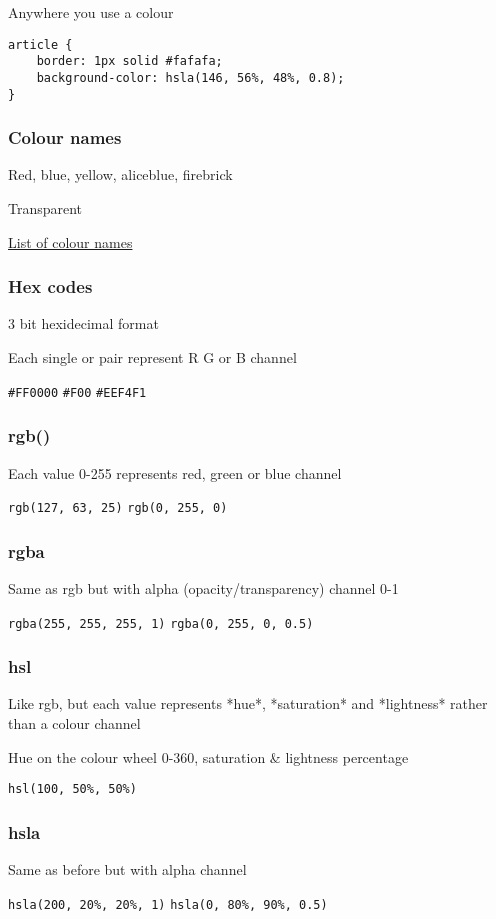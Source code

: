 Anywhere you use a colour

\begin{verbatim}
article {
    border: 1px solid #fafafa;
    background-color: hsla(146, 56%, 48%, 0.8);
}
\end{verbatim}

\subsubsection{Colour names}

Red, blue, yellow, aliceblue, firebrick

Transparent

\href{https://en.wikipedia.org/wiki/X11_color_names}{List of colour names}


\subsubsection{Hex codes}

3 bit hexidecimal format

Each single or pair represent R G or B channel

\texttt{\#FF0000}
\texttt{\#F00}
\texttt{\#EEF4F1}

\subsubsection{rgb()}

Each value 0-255 represents red, green or blue channel

\texttt{rgb(127, 63, 25)}
\texttt{rgb(0, 255, 0)}

\subsubsection{rgba}

Same as rgb but with alpha (opacity/transparency) channel 0-1

\texttt{rgba(255, 255, 255, 1)}
\texttt{rgba(0, 255, 0, 0.5)}

\subsubsection{hsl}

Like rgb, but each value represents *hue*, *saturation* and *lightness* rather than a colour channel

Hue on the colour wheel 0-360, saturation \& lightness percentage

\texttt{hsl(100, 50\%, 50\%)}

\subsubsection{hsla}

Same as before but with alpha channel

\texttt{hsla(200, 20\%, 20\%, 1)}
\texttt{hsla(0, 80\%, 90\%, 0.5)}
